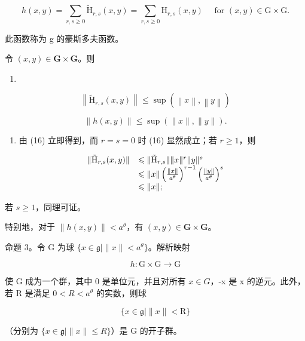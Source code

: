 \[
h (x, y) = \sum_ {r, s \geqslant 0} \tilde {\mathrm{H}} _ {r, s} (x, y) = \sum_ {r, s \geqslant 0} \mathrm{H} _ {r, s} (x, y) \quad \text { for } (x, y) \in \mathrm{G} \times \mathrm{G}.\tag{15}
\]

此函数称为 g 的豪斯多夫函数。

令 \((x,y)\in \mathbf{G}\times \mathbf{G}\)。则

\begin{enumerate}
\def\labelenumi{(\arabic{enumi})}
\setcounter{enumi}{15}
\tightlist
\item
\end{enumerate}

\[
\left\| \tilde {\mathrm{H}} _ {r, s} (x, y) \right\| \leqslant \sup (\left\| x \right\|, \left\| y \right\|)\tag{16}
\]

\[
\| h (x, y) \| \leqslant \sup (\| x \|, \| y \|).\tag{17}
\]

\begin{enumerate}
\def\labelenumi{(\arabic{enumi})}
\setcounter{enumi}{16}
\tightlist
\item
  由 (16) 立即得到，而 \(r = s = 0\) 时 (16) 显然成立；若 \(r \geqslant 1\)，则
\end{enumerate}

\[
\begin{array}{r l} \| \tilde {\mathrm{H}} _ {r, s} (x, y) \| & \leqslant \| \tilde {\mathrm{H}} _ {r, s} \| \| x \| ^ {r} \| y \| ^ {s} \\ & \leqslant \| x \| \left(\frac {\| x \|}{a ^ {\theta}}\right) ^ {r - 1} \left(\frac {\| y \|}{a ^ {\theta}}\right) ^ {s} \\ & \leqslant \| x \|; \end{array}
\]

若 \(s \geqslant 1\)，同理可证。

特别地，对于 \(\| h(x,y)\| < a^{\theta}\)，有 \((x,y)\in \mathbf{G}\times \mathbf{G}\)。

命题 3。令 G 为球 \(\{x\in\mathfrak{g}\mid\|x\|<a^{\theta}\}\)。解析映射

\[
h \colon \mathrm{G} \times \mathrm{G} \rightarrow \mathrm{G}
\]

使 G 成为一个群，其中 0 是单位元，并且对所有 \(x \in G\)，-x 是 x 的逆元。此外，若 R 是满足 \(0 < R < a^{\theta}\) 的实数，则球

\[
\{x \in \mathfrak {g} | \| x \| <   \mathrm{R} \}
\]

（分别为 \(\{x \in \mathfrak{g} \mid \|x\| \leqslant R\}\)）是 G 的开子群。

